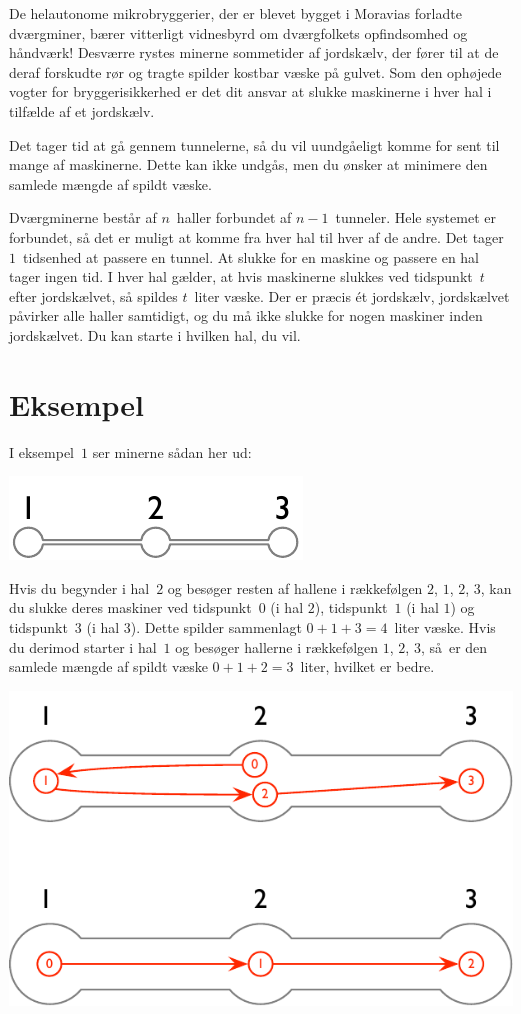
\noindent
De helautonome mikrobryggerier, der er blevet bygget i Moravias forladte dværgminer, bærer vitterligt vidnesbyrd om dværgfolkets opfindsomhed og håndværk!
Desværre rystes minerne sommetider af jordskælv, der fører til at de deraf forskudte rør og tragte spilder kostbar væske på gulvet.
Som den ophøjede vogter for bryggerisikkerhed er det dit ansvar at slukke maskinerne i hver hal i tilfælde af et jordskælv.

Det tager tid at gå gennem tunnelerne,
så du vil uundgåeligt komme for sent til mange af maskinerne.
Dette kan ikke undgås, men du ønsker at minimere den samlede mængde af spildt væske.

\medskip
Dværgminerne består af $n$~haller forbundet af $n-1$~tunneler.
Hele systemet er forbundet, så det er muligt at komme fra hver hal til hver af de andre.
Det tager $1$~tidsenhed at passere en tunnel.
At slukke for en maskine og passere en hal tager ingen tid.
I hver hal gælder, at hvis maskinerne slukkes ved tidspunkt~$t$ efter jordskælvet, så spildes $t$~liter væske.
Der er præcis ét jordskælv, jordskælvet påvirker alle haller samtidigt, og du må ikke slukke for nogen maskiner inden jordskælvet.
Du kan starte i hvilken hal, du vil.



\section*{Eksempel}

I eksempel~$1$ ser minerne sådan her ud:

\includegraphics[width=.2\textwidth]{img/sample-1.pdf}

Hvis du begynder i hal~$2$ og besøger resten af hallene i rækkefølgen $2$, $1$, $2$, $3$, kan du slukke deres maskiner ved tidspunkt~$0$ (i hal $2$), tidspunkt~$1$ (i hal $1$) og tidspunkt~$3$ (i hal $3$).
Dette spilder sammenlagt $0+1+3=4$~liter væske.
Hvis du derimod starter i hal~$1$ og besøger hallerne i rækkefølgen $1$, $2$, $3$, så er den samlede mængde af spildt væske $0+1+2=3$~liter, hvilket er bedre.

\includegraphics[width=.4\textwidth]{img/sample-1-ans.pdf}

